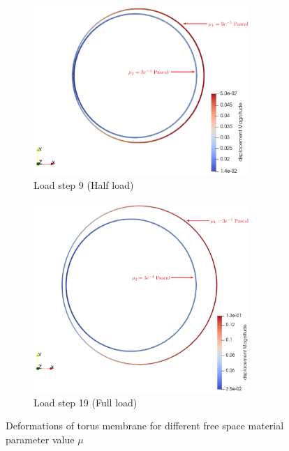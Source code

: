 \documentclass[11pt,a4paper,final]{article}
\begin{document}
\begin{figure}[ht!]
\centering 
\begin{subfigure}[b]{0.49\textwidth}
\centering
\includegraphics[width=0.9\textwidth]{mue_study_half_load.png}
\caption{Load step 9 (Half load)}
\label{fig:1.12.1}
\end{subfigure}
\begin{subfigure}[b]{0.49\textwidth}
\centering
\includegraphics[width=0.9\textwidth]{mue_study_full_load.png}
\caption{Load step 19 (Full load)}
\label{fig:1.12.2}
\end{subfigure}
\caption{Deformations of torus membrane for different free space material parameter value $\mu$}
\label{fig:1.12}
\end{figure}
\end{document}
